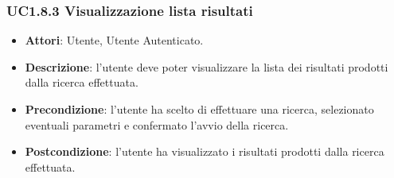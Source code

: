 \subsubsection{UC1.8.3 Visualizzazione lista risultati}
\begin{itemize}
\item \textbf{Attori}: Utente, Utente Autenticato.
\item \textbf{Descrizione}: l'utente deve poter visualizzare la lista dei risultati prodotti dalla ricerca effettuata.
\item \textbf{Precondizione}: l'utente ha scelto di effettuare una ricerca, selezionato eventuali parametri e confermato l'avvio della ricerca.
\item \textbf{Postcondizione}: l'utente ha visualizzato i risultati prodotti dalla ricerca effettuata.
\end{itemize}
